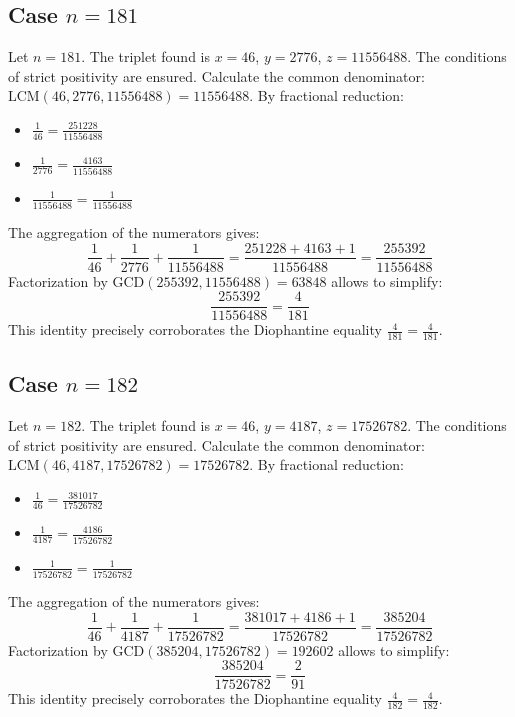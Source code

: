 \documentclass[11pt,a4paper]{article}
\begin{document}
\subsection{Case $n = 181$}
Let $n = 181$. The triplet found is $x = 46$, $y = 2776$, $z = 11556488$.
The conditions of strict positivity are ensured.
Calculate the common denominator: $\text{LCM}(46, 2776, 11556488) = 11556488$.
By fractional reduction:
\begin{itemize}
    \item $\frac{1}{46} = \frac{251228}{11556488}$
    \item $\frac{1}{2776} = \frac{4163}{11556488}$
    \item $\frac{1}{11556488} = \frac{1}{11556488}$
\end{itemize}
The aggregation of the numerators gives:
$$ \frac{1}{46} + \frac{1}{2776} + \frac{1}{11556488} = \frac{251228 + 4163 + 1}{11556488} = \frac{255392}{11556488} $$
Factorization by $\text{GCD}(255392, 11556488) = 63848$ allows to simplify:
$$ \frac{255392}{11556488} = \frac{4}{181} $$
This identity precisely corroborates the Diophantine equality $\frac{4}{181} = \frac{4}{181}$.

\subsection{Case $n = 182$}
Let $n = 182$. The triplet found is $x = 46$, $y = 4187$, $z = 17526782$.
The conditions of strict positivity are ensured.
Calculate the common denominator: $\text{LCM}(46, 4187, 17526782) = 17526782$.
By fractional reduction:
\begin{itemize}
    \item $\frac{1}{46} = \frac{381017}{17526782}$
    \item $\frac{1}{4187} = \frac{4186}{17526782}$
    \item $\frac{1}{17526782} = \frac{1}{17526782}$
\end{itemize}
The aggregation of the numerators gives:
$$ \frac{1}{46} + \frac{1}{4187} + \frac{1}{17526782} = \frac{381017 + 4186 + 1}{17526782} = \frac{385204}{17526782} $$
Factorization by $\text{GCD}(385204, 17526782) = 192602$ allows to simplify:
$$ \frac{385204}{17526782} = \frac{2}{91} $$
This identity precisely corroborates the Diophantine equality $\frac{4}{182} = \frac{4}{182}$.
\end{document}
